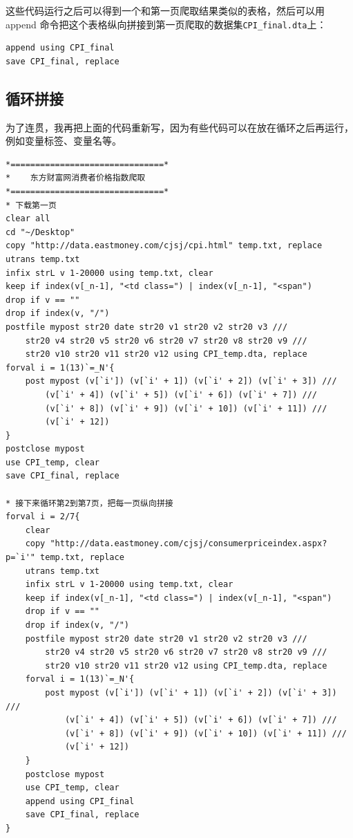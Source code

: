 \documentclass[cn,fancy,blue,11pt]{elegantbook}
\begin{document}
这些代码运行之后可以得到一个和第一页爬取结果类似的表格，然后可以用 append 命令把这个表格纵向拼接到第一页爬取的数据集\lstinline{CPI_final.dta}上：

\begin{lstlisting}
append using CPI_final
save CPI_final, replace
\end{lstlisting}

\hypertarget{section-38}{%
\subsection{循环拼接}\label{section-38}}

为了连贯，我再把上面的代码重新写，因为有些代码可以在放在循环之后再运行，例如变量标签、变量名等。

\begin{lstlisting}
*===============================*
*    东方财富网消费者价格指数爬取
*===============================*
* 下载第一页
clear all
cd "~/Desktop"
copy "http://data.eastmoney.com/cjsj/cpi.html" temp.txt, replace
utrans temp.txt
infix strL v 1-20000 using temp.txt, clear
keep if index(v[_n-1], "<td class=") | index(v[_n-1], "<span")
drop if v == ""
drop if index(v, "/")
postfile mypost str20 date str20 v1 str20 v2 str20 v3 ///
    str20 v4 str20 v5 str20 v6 str20 v7 str20 v8 str20 v9 ///
    str20 v10 str20 v11 str20 v12 using CPI_temp.dta, replace
forval i = 1(13)`=_N'{
    post mypost (v[`i']) (v[`i' + 1]) (v[`i' + 2]) (v[`i' + 3]) ///
        (v[`i' + 4]) (v[`i' + 5]) (v[`i' + 6]) (v[`i' + 7]) ///
        (v[`i' + 8]) (v[`i' + 9]) (v[`i' + 10]) (v[`i' + 11]) ///
        (v[`i' + 12])
}
postclose mypost
use CPI_temp, clear
save CPI_final, replace

* 接下来循环第2到第7页，把每一页纵向拼接
forval i = 2/7{
    clear
    copy "http://data.eastmoney.com/cjsj/consumerpriceindex.aspx?p=`i'" temp.txt, replace
    utrans temp.txt
    infix strL v 1-20000 using temp.txt, clear
    keep if index(v[_n-1], "<td class=") | index(v[_n-1], "<span")
    drop if v == ""
    drop if index(v, "/")
    postfile mypost str20 date str20 v1 str20 v2 str20 v3 ///
        str20 v4 str20 v5 str20 v6 str20 v7 str20 v8 str20 v9 ///
        str20 v10 str20 v11 str20 v12 using CPI_temp.dta, replace
    forval i = 1(13)`=_N'{
        post mypost (v[`i']) (v[`i' + 1]) (v[`i' + 2]) (v[`i' + 3]) ///
            (v[`i' + 4]) (v[`i' + 5]) (v[`i' + 6]) (v[`i' + 7]) ///
            (v[`i' + 8]) (v[`i' + 9]) (v[`i' + 10]) (v[`i' + 11]) ///
            (v[`i' + 12])
    }
    postclose mypost
    use CPI_temp, clear
    append using CPI_final
    save CPI_final, replace
}


\end{lstlisting}
\end{document}
